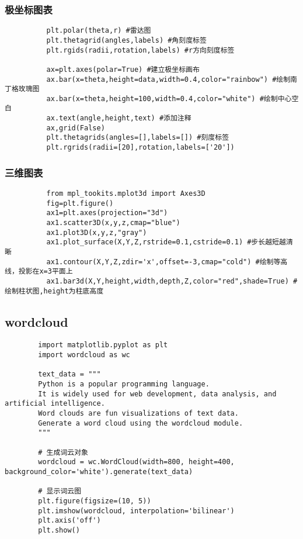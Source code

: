 \documentclass{article}
\begin{document}
      \subsubsection{极坐标图表}
        \begin{lstlisting}
          plt.polar(theta,r) #雷达图
          plt.thetagrid(angles,labels) #角刻度标签
          plt.rgids(radii,rotation,labels) #r方向刻度标签

          ax=plt.axes(polar=True) #建立极坐标画布
          ax.bar(x=theta,height=data,width=0.4,color="rainbow") #绘制南丁格玫瑰图
          ax.bar(x=theta,height=100,width=0.4,color="white") #绘制中心空白
          ax.text(angle,height,text) #添加注释
          ax,grid(False)
          plt.thetagrids(angles=[],labels=[]) #刻度标签
          plt.rgrids(radii=[20],rotation,labels=['20'])
        \end{lstlisting}

      \subsubsection{三维图表}
        \begin{lstlisting}
          from mpl_tookits.mplot3d import Axes3D
          fig=plt.figure()
          ax1=plt.axes(projection="3d")
          ax1.scatter3D(x,y,z,cmap="blue")
          ax1.plot3D(x,y,z,"gray")
          ax1.plot_surface(X,Y,Z,rstride=0.1,cstride=0.1) #步长越短越清晰
          ax1.contour(X,Y,Z,zdir='x',offset=-3,cmap="cold") #绘制等高线，投影在x=3平面上
          ax1.bar3d(X,Y,height,width,depth,Z,color="red",shade=True) #绘制柱状图,height为柱底高度
        \end{lstlisting}

    \subsection{wordcloud}
      \begin{lstlisting}
        import matplotlib.pyplot as plt
        import wordcloud as wc

        text_data = """
        Python is a popular programming language.
        It is widely used for web development, data analysis, and artificial intelligence.
        Word clouds are fun visualizations of text data.
        Generate a word cloud using the wordcloud module.
        """

        # 生成词云对象
        wordcloud = wc.WordCloud(width=800, height=400, background_color='white').generate(text_data)

        # 显示词云图
        plt.figure(figsize=(10, 5))
        plt.imshow(wordcloud, interpolation='bilinear')
        plt.axis('off')
        plt.show()
      \end{lstlisting}
\end{document}
